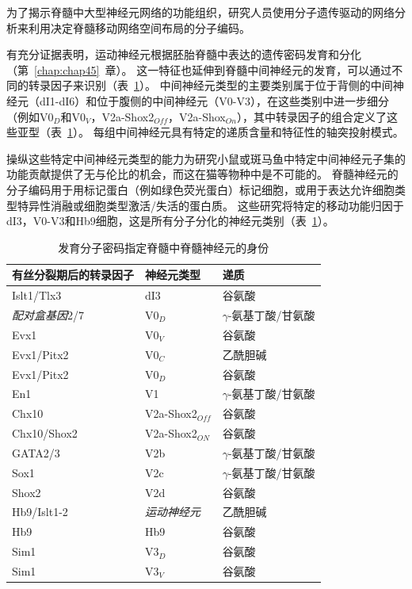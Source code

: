 \begin{proposition} \label{box:33_3}
	
	\quad \quad 为了揭示脊髓中大型神经元网络的功能组织，研究人员使用分子遗传驱动的网络分析来利用决定脊髓移动网络空间布局的分子编码。
	
	\quad \quad 有充分证据表明，运动神经元根据胚胎脊髓中表达的遗传密码发育和分化（第~\ref{chap:chap45}~章）。
	这一特征也延伸到脊髓中间神经元的发育，可以通过不同的转录因子来识别（表~\ref{tab:33_1}）。
	中间神经元类型的主要类别属于位于背侧的中间神经元（dI1-dI6）和位于腹侧的中间神经元（V0-V3），在这些类别中进一步细分（例如V0$_D$和V0$_V$，V2a-Shox2$_{Off}$，V2a-Shox$_{On}$），其中转录因子的组合定义了这些亚型（表~\ref{tab:33_1}）。
	每组中间神经元具有特定的递质含量和特征性的轴突投射模式。
	
	\quad \quad 操纵这些特定中间神经元类型的能力为研究小鼠或斑马鱼中特定中间神经元子集的功能贡献提供了无与伦比的机会，而这在猫等物种中是不可能的。
	脊髓神经元的分子编码用于用标记蛋白（例如绿色荧光蛋白）标记细胞，或用于表达允许细胞类型特异性消融或细胞类型激活/失活的蛋白质。
	这些研究将特定的移动功能归因于dI3，V0-V3和Hb9细胞，这是所有分子分化的神经元类别（表~\ref{tab:33_1}）。
	
\end{proposition}


\begin{table}[htbp]
	\caption{发育分子密码指定脊髓中脊髓神经元的身份} \label{tab:33_1} \centering
	\begin{tabular}{lll}
		\toprule
		有丝分裂期后的转录因子 & 神经元类型 & 递质 \\
		\midrule
		Islt1/Tlx3 & dI3 & 谷氨酸  \\
		\textit{配对盒基因}2/7 & V0$_D$ & $\gamma$-氨基丁酸/甘氨酸  \\
		Evx1 & V0$_V$ & 谷氨酸  \\
		Evx1/Pitx2 & V0$_C$ & 乙酰胆碱  \\
		Evx1/Pitx2 & V0$_D$ & 谷氨酸  \\
		En1 & V1 & $\gamma$-氨基丁酸/甘氨酸  \\
		Chx10 & V2a-Shox2$_{Off}$ & 谷氨酸  \\
		Chx10/Shox2 & V2a-Shox2$_{ON}$ & 谷氨酸  \\
		GATA2/3 & V2b & $\gamma$-氨基丁酸/甘氨酸  \\
		Sox1 & V2c & $\gamma$-氨基丁酸/甘氨酸  \\
		Shox2 & V2d & 谷氨酸  \\
		Hb9/Islt1-2 & \textit{运动神经元} & 乙酰胆碱  \\
		Hb9 & Hb9 & 谷氨酸  \\
		Sim1 & V3$_D$ & 谷氨酸  \\
		Sim1 & V3$_V$ & 谷氨酸  \\
		\bottomrule
	\end{tabular}
\end{table}


